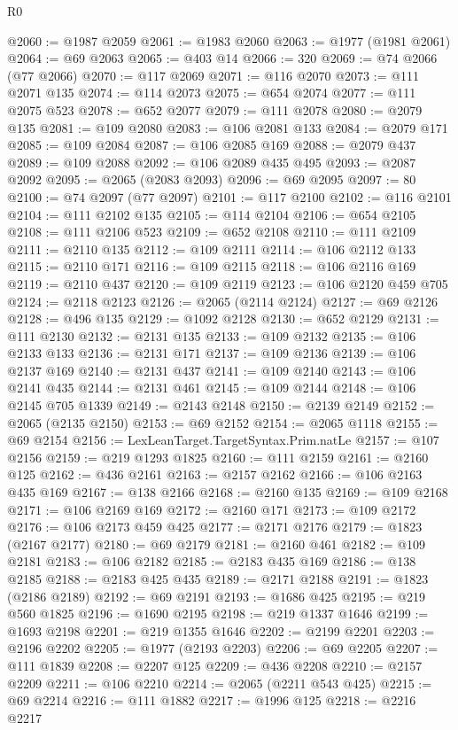\begin{lexlean}{R0}
\begin{coremodule}
@2060 := @1987 @2059
@2061 := @1983 @2060
@2063 := @1977 (@1981 @2061)
@2064 := @69 @2063
@2065 := @403 @14
@2066 := 320
@2069 := @74 @2066 (@77 @2066)
@2070 := @117 @2069
@2071 := @116 @2070
@2073 := @111 @2071 @135
@2074 := @114 @2073
@2075 := @654 @2074
@2077 := @111 @2075 @523
@2078 := @652 @2077
@2079 := @111 @2078
@2080 := @2079 @135
@2081 := @109 @2080
@2083 := @106 @2081 @133
@2084 := @2079 @171
@2085 := @109 @2084
@2087 := @106 @2085 @169
@2088 := @2079 @437
@2089 := @109 @2088
@2092 := @106 @2089 @435 @495
@2093 := @2087 @2092
@2095 := @2065 (@2083 @2093)
@2096 := @69 @2095
@2097 := 80
@2100 := @74 @2097 (@77 @2097)
@2101 := @117 @2100
@2102 := @116 @2101
@2104 := @111 @2102 @135
@2105 := @114 @2104
@2106 := @654 @2105
@2108 := @111 @2106 @523
@2109 := @652 @2108
@2110 := @111 @2109
@2111 := @2110 @135
@2112 := @109 @2111
@2114 := @106 @2112 @133
@2115 := @2110 @171
@2116 := @109 @2115
@2118 := @106 @2116 @169
@2119 := @2110 @437
@2120 := @109 @2119
@2123 := @106 @2120 @459 @705
@2124 := @2118 @2123
@2126 := @2065 (@2114 @2124)
@2127 := @69 @2126
@2128 := @496 @135
@2129 := @1092 @2128
@2130 := @652 @2129
@2131 := @111 @2130
@2132 := @2131 @135
@2133 := @109 @2132
@2135 := @106 @2133 @133
@2136 := @2131 @171
@2137 := @109 @2136
@2139 := @106 @2137 @169
@2140 := @2131 @437
@2141 := @109 @2140
@2143 := @106 @2141 @435
@2144 := @2131 @461
@2145 := @109 @2144
@2148 := @106 @2145 @705 @1339
@2149 := @2143 @2148
@2150 := @2139 @2149
@2152 := @2065 (@2135 @2150)
@2153 := @69 @2152
@2154 := @2065 @1118
@2155 := @69 @2154
@2156 := LexLeanTarget.TargetSyntax.Prim.natLe
@2157 := @107 @2156
@2159 := @219 @1293 @1825
@2160 := @111 @2159
@2161 := @2160 @125
@2162 := @436 @2161
@2163 := @2157 @2162
@2166 := @106 @2163 @435 @169
@2167 := @138 @2166
@2168 := @2160 @135
@2169 := @109 @2168
@2171 := @106 @2169 @169
@2172 := @2160 @171
@2173 := @109 @2172
@2176 := @106 @2173 @459 @425
@2177 := @2171 @2176
@2179 := @1823 (@2167 @2177)
@2180 := @69 @2179
@2181 := @2160 @461
@2182 := @109 @2181
@2183 := @106 @2182
@2185 := @2183 @435 @169
@2186 := @138 @2185
@2188 := @2183 @425 @435
@2189 := @2171 @2188
@2191 := @1823 (@2186 @2189)
@2192 := @69 @2191
@2193 := @1686 @425
@2195 := @219 @560 @1825
@2196 := @1690 @2195
@2198 := @219 @1337 @1646
@2199 := @1693 @2198
@2201 := @219 @1355 @1646
@2202 := @2199 @2201
@2203 := @2196 @2202
@2205 := @1977 (@2193 @2203)
@2206 := @69 @2205
@2207 := @111 @1839
@2208 := @2207 @125
@2209 := @436 @2208
@2210 := @2157 @2209
@2211 := @106 @2210
@2214 := @2065 (@2211 @543 @425)
@2215 := @69 @2214
@2216 := @111 @1882
@2217 := @1996 @125
@2218 := @2216 @2217

\end{coremodule}
\end{lexlean}
